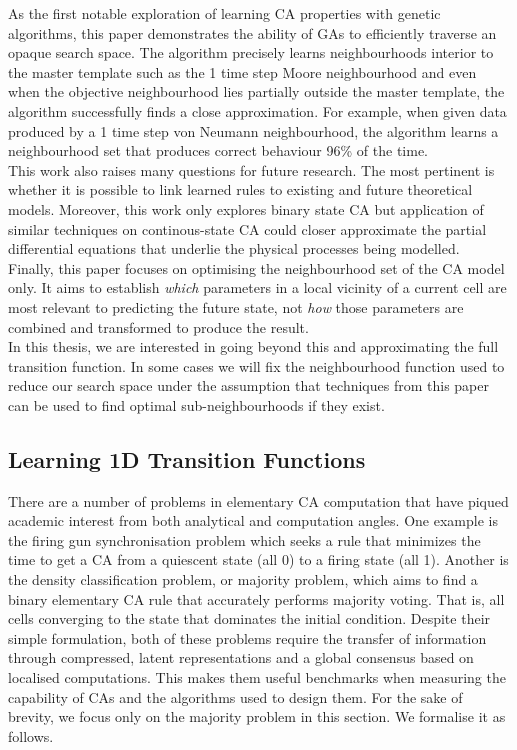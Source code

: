 As the first notable exploration of learning CA properties with genetic algorithms, this paper demonstrates the ability of GAs to efficiently traverse an opaque search space. The algorithm precisely learns neighbourhoods interior to the master template such as the 1 time step Moore neighbourhood and even when the objective neighbourhood lies partially outside the master template, the algorithm successfully finds a close approximation. For example, when given data produced by a 1 time step von Neumann neighbourhood, the algorithm learns a neighbourhood set that produces correct behaviour 96\% of the time.\\

This work also raises many questions for future research. The most pertinent is whether it is possible to link learned rules to existing and future theoretical models. Moreover, this work only explores binary state CA but application of similar techniques on continous-state CA could closer approximate the partial differential equations that underlie the physical processes being modelled.\\

Finally, this paper focuses on optimising the neighbourhood set of the CA model only. It aims to establish \textit{which} parameters in a local vicinity of a current cell are most relevant to predicting the future state, not \textit{how} those parameters are combined and transformed to produce the result.\\ In this thesis, we are interested in going beyond this and approximating the full transition function. In some cases we will fix the neighbourhood function used to reduce our search space under the assumption that techniques from this paper can be used to find optimal sub-neighbourhoods if they exist.\\


\subsection{Learning 1D Transition Functions}

There are a number of problems in elementary CA computation that have piqued academic interest from both analytical and computation angles. One example is the firing gun synchronisation problem\cite{moore1964firing} which seeks a rule that minimizes the time to get a CA from a quiescent state (all 0) to a firing state (all 1). Another is the density classification problem, or majority problem, which aims to find a binary elementary CA rule that accurately performs majority voting. That is, all cells converging to the state that dominates the initial condition. Despite their simple formulation, both of these problems require the transfer of information through compressed, latent representations and a global consensus based on localised computations. This makes them useful benchmarks when measuring the capability of CAs and the algorithms used to design them. For the sake of brevity, we focus only on the majority problem in this section. We formalise it as follows.

